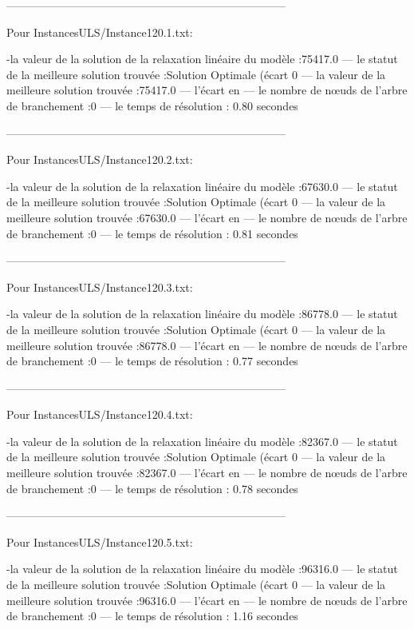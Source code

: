 ---------------------------------------------------------------------------

Pour InstancesULS/Instance120.1.txt:


-la valeur de la solution de la relaxation linéaire du modèle :75417.0
— le statut de la meilleure solution trouvée :Solution Optimale (écart 0%
— la valeur de la meilleure solution trouvée :75417.0
— l’écart en %
— le nombre de nœuds de l’arbre de branchement :0
— le temps de résolution : 0.80 secondes

---------------------------------------------------------------------------

Pour InstancesULS/Instance120.2.txt:


-la valeur de la solution de la relaxation linéaire du modèle :67630.0
— le statut de la meilleure solution trouvée :Solution Optimale (écart 0%
— la valeur de la meilleure solution trouvée :67630.0
— l’écart en %
— le nombre de nœuds de l’arbre de branchement :0
— le temps de résolution : 0.81 secondes


---------------------------------------------------------------------------

Pour InstancesULS/Instance120.3.txt:


-la valeur de la solution de la relaxation linéaire du modèle :86778.0
— le statut de la meilleure solution trouvée :Solution Optimale (écart 0%
— la valeur de la meilleure solution trouvée :86778.0
— l’écart en %
— le nombre de nœuds de l’arbre de branchement :0
— le temps de résolution : 0.77 secondes


---------------------------------------------------------------------------

Pour InstancesULS/Instance120.4.txt:


-la valeur de la solution de la relaxation linéaire du modèle :82367.0
— le statut de la meilleure solution trouvée :Solution Optimale (écart 0%
— la valeur de la meilleure solution trouvée :82367.0
— l’écart en %
— le nombre de nœuds de l’arbre de branchement :0
— le temps de résolution : 0.78 secondes

---------------------------------------------------------------------------

Pour InstancesULS/Instance120.5.txt:


-la valeur de la solution de la relaxation linéaire du modèle :96316.0
— le statut de la meilleure solution trouvée :Solution Optimale (écart 0%
— la valeur de la meilleure solution trouvée :96316.0
— l’écart en %
— le nombre de nœuds de l’arbre de branchement :0
— le temps de résolution : 1.16 secondes

